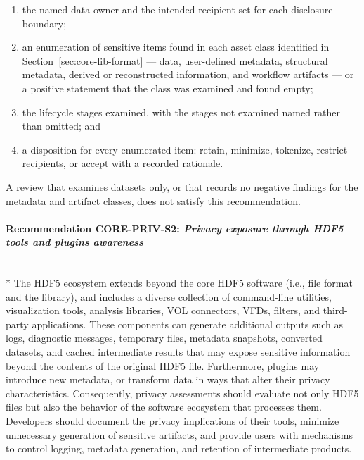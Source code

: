 \documentclass[../main.tex]{subfiles}
\begin{document}
\begin{enumerate}[label=(\alph*),leftmargin=2em]
    \item the named data owner and the intended recipient set for each
          disclosure boundary;
    \item an enumeration of sensitive items found in each asset class
          identified in Section~\ref{sec:core-lib-format} --- data,
          user-defined metadata, structural metadata, derived or reconstructed
          information, and workflow artifacts --- or a positive statement that
          the class was examined and found empty;
    \item the lifecycle stages examined, with the stages not examined named
          rather than omitted; and
    \item a disposition for every enumerated item: retain, minimize,
          tokenize, restrict recipients, or accept with a recorded rationale.
\end{enumerate}

A review that examines datasets only, or that records no negative findings for
the metadata and artifact classes, does not satisfy this recommendation.

\paragraph{Recommendation CORE-PRIV-S2: \emph{Privacy exposure through HDF5 tools and plugins awareness}}\mbox{}\\*
The HDF5 ecosystem extends beyond the core HDF5 software (i.e., file format and the library), 
and includes a diverse collection of command-line utilities, visualization tools, 
analysis libraries, VOL connectors, VFDs, filters, and third-party applications. 
These components can generate additional outputs such as logs, diagnostic
messages, temporary files, metadata snapshots, converted datasets, and cached 
intermediate results that may expose sensitive information beyond the contents of the 
original HDF5 file. Furthermore, plugins may introduce new metadata, or transform 
data in ways that alter their privacy characteristics. Consequently, privacy 
assessments should evaluate not only HDF5 files but also the behavior of the
software ecosystem that processes them. Developers should document the privacy
implications of their tools, minimize unnecessary generation of sensitive artifacts,
and provide users with mechanisms to control logging, metadata generation, and
retention of intermediate products.
\end{document}
